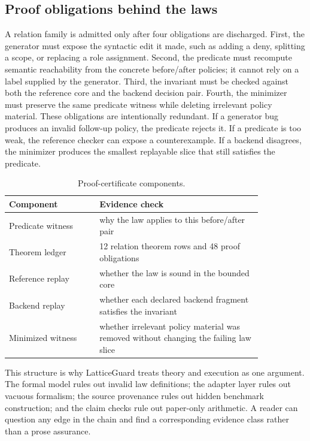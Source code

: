 \documentclass[10pt,conference]{IEEEtran}
\begin{document}
\subsection{Proof obligations behind the laws}
A relation family is admitted only after four obligations are discharged.  First, the generator must expose the syntactic edit it made, such as adding a deny, splitting a scope, or replacing a role assignment.  Second, the predicate must recompute semantic reachability from the concrete before/after policies; it cannot rely on a label supplied by the generator.  Third, the invariant must be checked against both the reference core and the backend decision pair.  Fourth, the minimizer must preserve the same predicate witness while deleting irrelevant policy material.  These obligations are intentionally redundant.  If a generator bug produces an invalid follow-up policy, the predicate rejects it.  If a predicate is too weak, the reference checker can expose a counterexample.  If a backend disagrees, the minimizer produces the smallest replayable slice that still satisfies the predicate.

\begin{table}[t]
\centering
\caption{Proof-certificate components.}
\label{tab:proofcert}
\begin{tabular}{p{0.30\linewidth}p{0.54\linewidth}}
\toprule
Component & Evidence check \\
\midrule
Predicate witness & why the law applies to this before/after pair \\
Theorem ledger & 12 relation theorem rows and 48 proof obligations \\
Reference replay & whether the law is sound in the bounded core \\
Backend replay & whether each declared backend fragment satisfies the invariant \\
Minimized witness & whether irrelevant policy material was removed without changing the failing law slice \\
\bottomrule
\end{tabular}
\end{table}

This structure is why LatticeGuard treats theory and execution as one argument.  The formal model rules out invalid law definitions; the adapter layer rules out vacuous formalism; the source provenance rules out hidden benchmark construction; and the claim checks rule out paper-only arithmetic.  A reader can question any edge in the chain and find a corresponding evidence class rather than a prose assurance.
\end{document}
